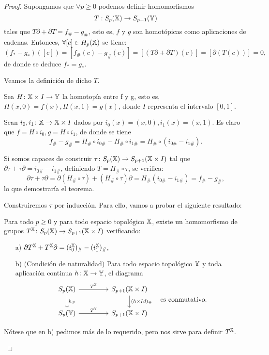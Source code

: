 \begin{proof}
  Supongamos que $\forall p \geq 0$ podemos definir homomorfismos \[T: S_{p}({\mathbb X}) \to S_{p+1}({\mathbb Y}) \] tales que $T\partial + \partial T = f_\# - g_\#$,
  esto es, $f$ y $g$ son homotópicas como aplicaciones de cadenas. Entonces, $\forall [c] \in H_p({\mathbb X})$ se tiene:
  \[ (f_* - g_*)([c]) = [f_\#(c) - g_\#(c)] = [(T\partial + \partial T)(c)] = [\partial(T(c))] = 0,\]
  de donde se deduce $f_* = g_*$.

  Veamos la definición de dicho $T$.

  Sea $H \colon {\mathbb X} \times I \to {\mathbb Y}$ la homotopía entre f y g, esto es,
  $H(x, 0) = f(x), H(x, 1) = g(x)$, donde $I$ representa el intervalo $[0, 1]$.

  Sean $i_0, i_1 \colon {\mathbb X} \to {\mathbb X} \times I$ dados por $i_0(x) = (x, 0), i_1(x) = (x, 1)$. Es claro que $f = H \circ i_0, g = H \circ i_1$, de donde
  se tiene \[ f_\# - g_\# = H_\# \circ i_{0\#} - H_\# \circ i_{1\#} = H_\# \circ (i_{0\#} - i_{1\#}). \]

  Si somos capaces de construir $\tau \colon S_{p}({\mathbb X}) \to S_{p+1}({\mathbb X} \times I)$ tal que $\partial \tau + \tau \partial = i_{0\#} - i_{1\#}$, definiendo
  $T = H_\# \circ \tau$, se verifica:
  \[ \partial \tau + \tau \partial = \partial(H_\# \circ \tau) + (H_\# \circ \tau)\partial = H_\#(i_{0\#} - i_{1\#}) = f_\# - g_\#,  \]
  lo que demostraría el teorema.

  Construiremos $\tau$ por inducción. Para ello, vamos a probar el siguiente resultado:
  \begin{lemma}
    Para todo $p \geq 0$ y para todo espacio topológico ${\mathbb X}$, existe un homomorfismo de grupos $T^{\mathbb X} \colon S_{p}({\mathbb X}) \to S_{p+1}({\mathbb X} \times I)$ verificando:
    \begin{itemize}
      \item[a)] $\partial T^{\mathbb X} + T^{\mathbb X} \partial = (i_0^{\mathbb X})_\# - (i_1^{\mathbb X})_\#,$
      \item[b)] (Condición de naturalidad) Para todo espacio topológico ${\mathbb Y}$ y toda aplicación continua $h \colon {\mathbb X} \to {\mathbb Y}$, el diagrama
      \[
      \begin{tikzcd}
        \SX{p} \arrow{r}{T^\X} \arrow{d}{h_\#} & [2em] S_{p+1}(\X \times I) \arrow{d}{(h \times Id)_\#} \\
        \SY{p} \arrow{r}{T^\Y}                 & S_{p+1}(\X \times I)
      \end{tikzcd}
      \quad \text{es conmutativo.}
      \]
    \end{itemize}
    Nótese que en b) pedimos más de lo requerido, pero nos sirve para definir $T^{\mathbb X}$.
  \end{lemma}


\end{proof}
